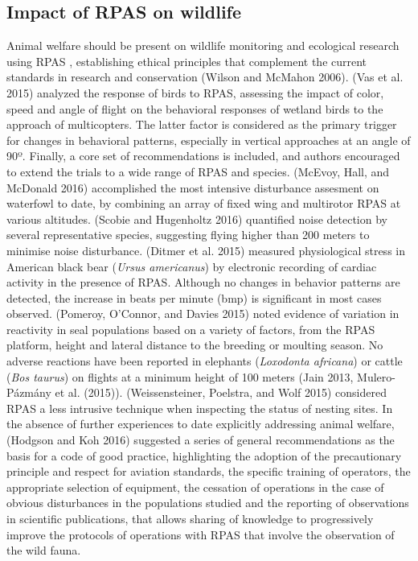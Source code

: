 \documentclass[]{interact}
\theoremstyle{plain}%
\theoremstyle{definition}
\theoremstyle{remark}
\begin{document}
\subsection{Impact of RPAS on
wildlife}\label{impact-of-rpas-on-wildlife}

Animal welfare should be present on wildlife monitoring and ecological
research using RPAS , establishing ethical principles that complement
the current standards in research and conservation (Wilson and McMahon
2006). (Vas et al. 2015) analyzed the response of birds to RPAS,
assessing the impact of color, speed and angle of flight on the
behavioral responses of wetland birds to the approach of multicopters.
The latter factor is considered as the primary trigger for changes in
behavioral patterns, especially in vertical approaches at an angle of
90º. Finally, a core set of recommendations is included, and authors
encouraged to extend the trials to a wide range of RPAS and species.
(McEvoy, Hall, and McDonald 2016) accomplished the most intensive
disturbance assesment on waterfowl to date, by combining an array of
fixed wing and multirotor RPAS at various altitudes. (Scobie and
Hugenholtz 2016) quantified noise detection by several representative
species, suggesting flying higher than 200 meters to minimise noise
disturbance. (Ditmer et al. 2015) measured physiological stress in
American black bear (\emph{Ursus americanus}) by electronic recording of
cardiac activity in the presence of RPAS. Although no changes in
behavior patterns are detected, the increase in beats per minute (bmp)
is significant in most cases observed. (Pomeroy, O'Connor, and Davies
2015) noted evidence of variation in reactivity in seal populations
based on a variety of factors, from the RPAS platform, height and
lateral distance to the breeding or moulting season. No adverse
reactions have been reported in elephants (\emph{Loxodonta africana}) or
cattle (\emph{Bos taurus}) on flights at a minimum height of 100 meters
(Jain 2013, Mulero-Pázmány et al. (2015)). (Weissensteiner, Poelstra,
and Wolf 2015) considered RPAS a less intrusive technique when
inspecting the status of nesting sites. In the absence of further
experiences to date explicitly addressing animal welfare, (Hodgson and
Koh 2016) suggested a series of general recommendations as the basis for
a code of good practice, highlighting the adoption of the precautionary
principle and respect for aviation standards, the specific training of
operators, the appropriate selection of equipment, the cessation of
operations in the case of obvious disturbances in the populations
studied and the reporting of observations in scientific publications,
that allows sharing of knowledge to progressively improve the protocols
of operations with RPAS that involve the observation of the wild fauna.
\end{document}
